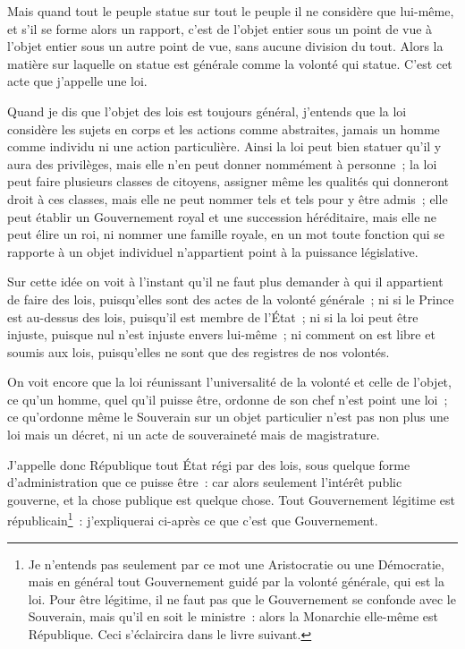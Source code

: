 \documentclass[french,twoside]{book} %
\begin{document}
Mais quand tout le peuple statue sur tout le peuple il ne considère que lui-même, et s’il se forme alors un rapport, c’est de l’objet entier sous un point de vue à l’objet entier sous un autre point de vue, sans aucune division du tout. Alors la matière sur laquelle on statue est générale comme la volonté qui statue. C’est cet acte que j’appelle une loi.\par
Quand je dis que l’objet des lois est toujours général, j’entends que la loi considère les sujets en corps et les actions comme abstraites, jamais un homme comme individu ni une action particulière. Ainsi la loi peut bien statuer qu’il y aura des privilèges, mais elle n’en peut donner nommément à personne ; la loi peut faire plusieurs classes de citoyens, assigner même les qualités qui donneront droit à ces classes, mais elle ne peut nommer tels et tels pour y être admis ; elle peut établir un Gouvernement royal et une succession héréditaire, mais elle ne peut élire un roi, ni nommer une famille royale, en un mot toute fonction qui se rapporte à un objet individuel n’appartient point à la puissance législative.\par
Sur cette idée on voit à l’instant qu’il ne faut plus demander à qui il appartient de faire des lois, puisqu’elles sont des actes de la volonté générale ; ni si le Prince est au-dessus des lois, puisqu’il est membre de l’État ; ni si la loi peut être injuste, puisque nul n’est injuste envers lui-même ; ni comment on est libre et soumis aux lois, puisqu’elles ne sont que des registres de nos volontés.\par
On voit encore que la loi réunissant l’universalité de la volonté et celle de l’objet, ce qu’un homme, quel qu’il puisse être, ordonne de son chef n’est point une loi ; ce qu’ordonne même le Souverain sur un objet particulier n’est pas non plus une loi mais un décret, ni un acte de souveraineté mais de magistrature.\par
J’appelle donc République tout État régi par des lois, sous quelque forme d’administration que ce puisse être : car alors seulement l’intérêt public gouverne, et la chose publique est quelque chose. Tout Gouvernement légitime est républicain\footnote{Je n’entends pas seulement par ce mot une Aristocratie ou une Démocratie, mais en général tout Gouvernement guidé par la volonté générale, qui est la loi. Pour être légitime, il ne faut pas que le Gouvernement se confonde avec le Souverain, mais qu’il en soit le ministre : alors la Monarchie elle-même est République. Ceci s’éclaircira dans le livre suivant.} : j’expliquerai ci-après ce que c’est que Gouvernement.\par
\end{document}
